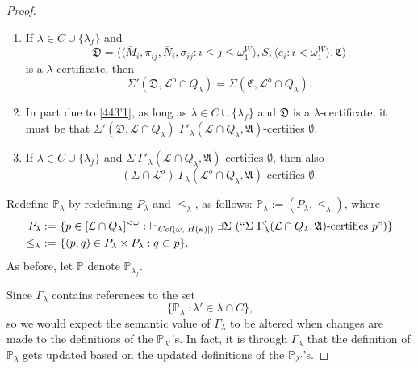 \documentclass[12pt]{article}
\numberwithin{equation}{section}
\begin{document}
\begin{proof}
\begin{rem}\label{rem443}
\leavevmode
\begin{enumerate}[label=(\arabic*)]
    \item\label{443'1} If $\lambda \in C \cup \{\lambda_f\}$ and
    \begin{equation*}
        \mathfrak{D} = \langle \langle \bar{M}_i, \pi_{ij},  \bar{N}_i, \sigma_{ij} : i \leq j \leq \omega_1^{W} \rangle, S, \langle e_i : i < \omega_1^W \rangle, \mathfrak{C} \rangle
    \end{equation*}
    is a $\lambda$-certificate, then
    \begin{equation*}
        \Sigma'(\mathfrak{D}, \mathcal{L}^o \cap Q_{\lambda}) = \Sigma(\mathfrak{C}, \mathcal{L}^o \cap Q_{\lambda}) \text{.}
    \end{equation*}
    \item\label{443'2} In part due to \ref{443'1}, as long as $\lambda \in C \cup \{\lambda_f\}$ and $\mathfrak{D}$ is a $\lambda$-certificate, it must be that $\Sigma'(\mathfrak{D}, \mathcal{L} \cap Q_{\lambda})$ $\Gamma'_{\lambda} (\mathcal{L} \cap Q_{\lambda}, \mathfrak{A})$-certifies $\emptyset$.
    \item\label{443'3} If $\lambda \in C \cup \{\lambda_f\}$ and $\Sigma \ \Gamma'_{\lambda} (\mathcal{L} \cap Q_{\lambda}, \mathfrak{A}) \text{-certifies } \emptyset$, then also
    \begin{equation*}
        (\Sigma \cap \mathcal{L}^o) \ \Gamma_{\lambda} (\mathcal{L}^o \cap Q_{\lambda}, \mathfrak{A}) \text{-certifies } \emptyset \text{.}
    \end{equation*}
\end{enumerate}
\end{rem}

Redefine $\mathbb{P}_{\lambda}$ by redefining $P_{\lambda}$ and $\leq_{\lambda}$, as follows: $\mathbb{P}_{\lambda} := (P_{\lambda}, \leq_{\lambda})$, where
\begin{align*}
    P_{\lambda} := \ & \{p \in [\mathcal{L} \cap Q_{\lambda}]^{< \omega} : \ \Vdash_{Col(\omega, |H(\kappa)|)} \exists \Sigma \ (``\Sigma \ \Gamma'_{\lambda} (\mathcal{L} \cap Q_{\lambda}, \mathfrak{A}) \text{-certifies } p")\} \\
    \leq_{\lambda} \ := \ & \{(p, q) \in P_{\lambda} \times P_{\lambda} : q \subset p\} \text{.}
\end{align*}
As before, let $\mathbb{P}$ denote $\mathbb{P}_{\lambda_f}$. 

Since $\Gamma_{\lambda}$ contains references to the set 
\begin{equation*}
    \{\mathbb{P}_{\lambda'} : \lambda' \in \lambda \cap C\} \text{,}
\end{equation*}
so we would expect the semantic value of $\Gamma_{\lambda}$ to be altered when changes are made to the definitions of the $\mathbb{P}_{\lambda'}$'s. In fact, it is through $\Gamma_{\lambda}$ that the definition of $\mathbb{P}_{\lambda}$ gets updated based on the updated definitions of the $\mathbb{P}_{\lambda'}$'s.


\end{proof}
\end{document}
